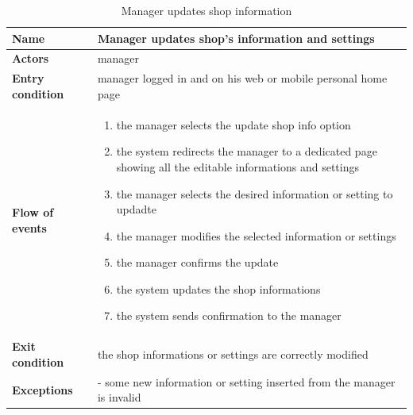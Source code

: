 \begin{table}[h!]
    \centering
    \begin{tabular}{@{}P{0.2\textwidth}P{0.70\textwidth}@{}}
        \toprule
        \textbf{Name}                 & Manager updates shop's information and settings\\
        \midrule
        \textbf{Actors}               & manager\\
        \textbf{Entry condition}      & manager logged in and on his web or mobile personal home page\\
        \textbf{Flow of events}       & 
        \begin{enumerate}[nolistsep, leftmargin=*]
            \item the manager selects the update shop info option
            \item the system redirects the manager to a dedicated page showing all the editable informations and settings
            \item the manager selects the desired information or setting to updadte
            \item the manager modifies the selected information or settings
            \item the manager confirms the update
            \item the system updates the shop informations
            \item the system sends confirmation to the manager
        \end{enumerate} \\
        \textbf{Exit condition}       & the shop informations or settings are correctly modified\\
        \textbf{Exceptions}           
        & - some new information or setting inserted from the manager is invalid\\
        \bottomrule
    \end{tabular}
\caption{Manager updates shop information}
\label{table:managerupdatesshopinformation}
\end{table}

